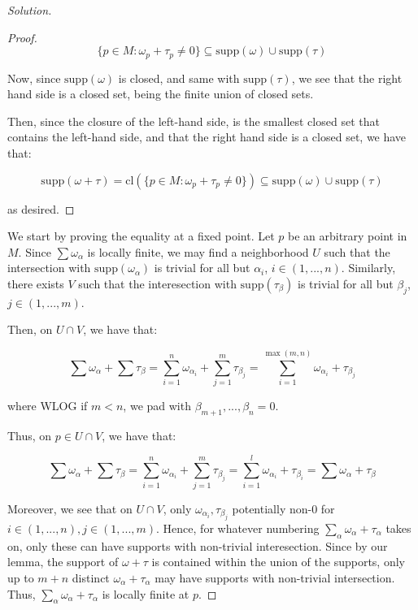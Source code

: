 \documentclass[10pt]{article}
\theoremstyle{nonumberplain}%
\begin{document}
\begin{proof}[Solution]
\begin{proof}
$$ \{ p \in M : \omega_p + \tau_p \not = 0 \} \subseteq \text{supp}(\omega) \cup \text{supp}(\tau) $$

Now, since $\text{supp}(\omega)$ is closed, and same with $\text{supp}(\tau)$, we see that the right hand side is a closed set, being the finite union of closed sets.

Then, since the closure of the left-hand side, is the smallest closed set that contains the left-hand side, and that the right hand side is a closed set, we have that:

$$ \text{supp}(\omega + \tau) = \text{cl}( \{ p \in M : \omega_p + \tau_p \not = 0 \}) \subseteq  \text{supp}(\omega) \cup \text{supp}(\tau) $$

as desired.


\end{proof}

We start by proving the equality at a fixed point. Let $p$ be an arbitrary point in $M$. Since $ \sum \omega_\alpha$ is locally finite, we may find a neighborhood $U$ such that the intersection with $\text{supp}( \omega_\alpha)$ is trivial for all but $\alpha_i$, $i \in (1,...,n)$. Similarly, there exists $V$ such that the interesection with $\text{supp}(\tau_\beta)$ is trivial for all but $\beta_j$, $j \in (1,...,m)$.

Then, on $U \cap V$, we have that:

$$ \sum \omega_\alpha + \sum \tau_\beta = \sum_{i=1}^n \omega_{\alpha_i} + \sum_{j=1}^m \tau_{\beta_j} = \sum_{i=1}^{\max(m,n)} \omega_{\alpha_i} + \tau_{\beta_j} $$

where WLOG if $m < n$, we pad with $ \beta_{m+1},...,\beta_n = 0$.

Thus, on $p \in U \cap V$, we have that:
 
$$ \sum \omega_\alpha + \sum \tau_\beta = \sum_{i=1}^n \omega_{\alpha_i} + \sum_{j=1}^m \tau_{\beta_j} = \sum_{i=1}^l \omega_{\alpha_i} + \tau_{\beta_i} = \sum \omega_\alpha  + \tau_\beta $$

Moreover, we see that on $U \cap V$, only $\omega_{\alpha_i}, \tau_{\beta_j}$ potentially non-0 for $i \in (1,...,n), j \in (1,...,m)$. Hence, for whatever numbering $\sum_\alpha \omega_\alpha + \tau_\alpha$ takes on, only these can have supports with non-trivial interesection. Since by our lemma, the support of $\omega + \tau$ is contained within the union of the supports, only up to $m+n$ distinct $\omega_\alpha + \tau_\alpha$ may have supports with non-trivial intersection. Thus, $\sum_\alpha \omega_\alpha + \tau_\alpha$ is locally finite at $p$.


\end{proof}
\end{document}

